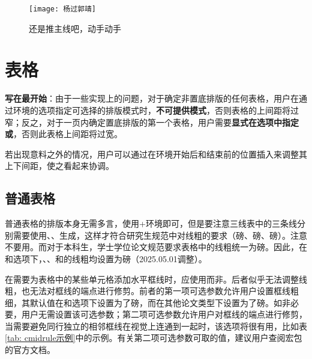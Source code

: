 \documentclass[print, doctor, vlined]{DissertUESTC}
\begin{document}
	\begin{figure}[!htb]
		\centering
		\texttt{[image: 杨过郭靖]}
		\caption{还是推主线吧，动手动手}
	\end{figure}
	
	\clearpage
	\section{表格}

	\textbf{写在最开始}：由于一些实现上的问题，对于确定非置底排版的任何表格，用户在通过环境的选项指定可选择的排版模式时，\textbf{不可提供模式}，否则表格的上间距将过窄；反之，对于一页内确定置底排版的第一个表格，用户需要\textbf{显式在选项中指定或}，否则此表格上间距将过宽。

	若出现意料之外的情况，用户可以通过在环境开始后和结束前的位置插入来调整其上下间距，使之看起来协调。
	
	\subsection{普通表格}
	
	普通表格的排版本身无需多言，使用+环境即可，但是要注意三线表中的三条线分别需要使用、、生成，这样才符合研究生规范中对线粗的要求（磅、磅、磅）。注意不要用。而对于本科生，学士学位论文规范要求表格中的线粗统一为磅。因此，在和选项下，、、和的线粗均设置为磅（2025.05.01调整）。
	
	在需要为表格中的某些单元格添加水平框线时，应使用\newline{}而非。后者似乎无法调整线粗，也无法对框线的端点进行修剪。前者的第一项可选参数允许用户设置框线粗细，其默认值在和选项下设置为了磅，而在其他论文类型下设置为了磅。如非必要，用户无需设置该可选参数；第二项可选参数允许用户对框线的端点进行修剪，当需要避免同行独立的相邻框线在视觉上连通到一起时，该选项将很有用，比如表\ref{tab: cmidrule示例}中的示例。有关第二项可选参数可取的值，建议用户查阅\href{https://mirrors.sustech.edu.cn/CTAN/macros/latex/contrib/booktabs/booktabs.pdf}{}宏包的官方文档。
	
\end{document}
